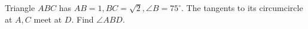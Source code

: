 Triangle $ABC$ has $AB=1,BC=\sqrt2,\angle B=75^\circ$. The tangents to its circumcircle at $A,C$ meet at $D$. Find $\angle ABD$.
